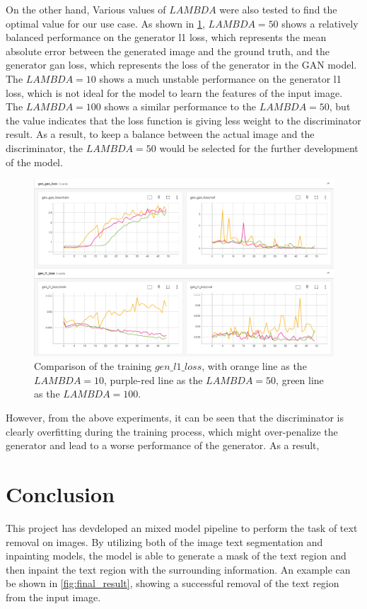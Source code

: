 \documentclass[10pt,twocolumn,letterpaper]{article}
\begin{document}
On the other hand, Various values of $LAMBDA$ were also tested to find the optimal value for our use case. As shown in \cref{fig:lambda}, $LAMBDA = 50$ shows a relatively balanced performance on 
the generator l1 loss, which represents the mean absolute error between the generated image and the ground truth, and the generator gan loss, which represents the loss of the generator in the GAN model.
The $LAMBDA = 10$ shows a much unstable performance on the generator l1 loss, which is not ideal for the model to learn the features of the input image. The $LAMBDA = 100$ shows a similar performance to the
$LAMBDA = 50$, but the value indicates that the loss function is giving less weight to the discriminator result. As a result, to keep a balance between the actual image and the discriminator, the $LAMBDA = 50$ 
would be selected for the further development of the model.

\begin{figure}[t]
    \centering
    \includegraphics[width=\linewidth]{figures/milestone/lambda.png}
    \caption{Comparison of the training $gen\_l1\_loss$, with orange line as the $LAMBDA = 10$, purple-red line as the $LAMBDA = 50$, green line as the $LAMBDA = 100$.}
    \label{fig:lambda}
\end{figure}

However, from the above experiments, it can be seen that the discriminator is clearly overfitting during the training process, which might over-penalize the generator and lead to a worse performance of the 
generator. As a result, 

\section{Conclusion}

This project has devdeloped an mixed model pipeline to perform the task of text removal on images. By utilizing both of the image text segmentation and inpainting models,
the model is able to generate a mask of the text region and then inpaint the text region with the surrounding information. An example can be shown in \cref{fig:final_result},
showing a successful removal of the text region from the input image.
\end{document}
